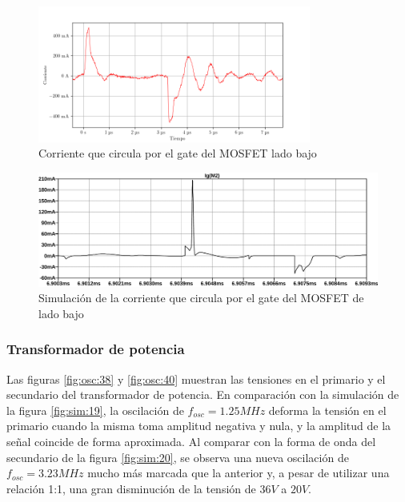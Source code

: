 \begin{figure}[H]
    \centering
    \includegraphics[width=0.8\textwidth]{images/capturas-osciloscopio/17-11-2022/17.png}
    \caption{Corriente que circula por el gate del MOSFET lado bajo}
    \label{fig:osc:17}
\end{figure}

\begin{figure}[H]
    \centering
    \includegraphics[width=\textwidth]{images/sim/9.pdf}
    \caption{Simulación de la corriente que circula por el gate del MOSFET de lado bajo}
    \label{fig:sim:9}
\end{figure}

\subsubsection{Transformador de potencia}

Las figuras \ref{fig:osc:38} y \ref{fig:osc:40} muestran las tensiones en el primario y el secundario del transformador de potencia. 
En comparación con la simulación de la figura \ref{fig:sim:19}, la oscilación de $f_{osc}=1.25MHz$ deforma la tensión en el primario cuando la misma toma amplitud negativa y nula, y la amplitud de la señal coincide de forma aproximada.
Al comparar con la forma de onda del secundario de la figura \ref{fig:sim:20}, se observa una nueva oscilación de $f_{osc}=3.23MHz$ mucho más marcada que la anterior y, a pesar de utilizar una relación 1:1, una gran disminución de la tensión de $36V$ a $20V$. 

